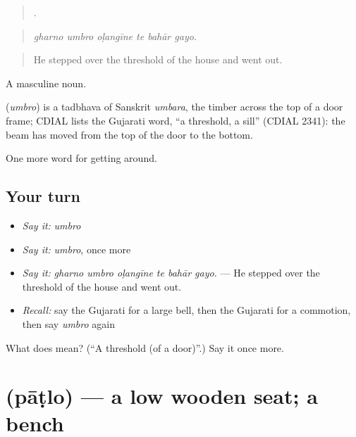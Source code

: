 \begin{quote}
     .
\end{quote}

\begin{quote}
\emph{gharno umbro oḷangīne te bahār gayo.}
\end{quote}

\begin{quote}
He stepped over the threshold of the house and went out.
\end{quote}

A masculine noun.

\begin{cousinweb}
\textbf{} (\emph{umbro}) is a tadbhava of Sanskrit \emph{umbara}, the timber across the top of a door frame; CDIAL lists the Gujarati word, \textquotedblleft{}a threshold, a sill\textquotedblright{} (CDIAL 2341): the beam has moved from the top of the door to the bottom.
\end{cousinweb}

\begin{grammarlens}[title={What you've built}]
One more word for getting around.
\end{grammarlens}

\subsection*{Your turn}
\begin{itemize}
\raggedright
  \item \emph{Say it:} \emph{umbro}
  \item \emph{Say it:} \emph{umbro}, once more
  \item \emph{Say it:} \emph{gharno umbro oḷangīne te bahār gayo.} — He stepped over the threshold of the house and went out.
  \item \emph{Recall:} say the Gujarati for a large bell, then the Gujarati for a commotion, then say \emph{umbro} again
\end{itemize}

\begin{tcolorbox}[breakable,colback=teal!4,colframe=teal!35!black,title={Before you move on}]
What does  mean? (\textquotedblleft{}A threshold (of a door)\textquotedblright{}.) Say it once more.
\end{tcolorbox}
\section[\texorpdfstring{\gu{પાટલો} (pāṭlo)}{પાટલો (pāṭlo)}]{ (pāṭlo) — a low wooden seat; a bench}

